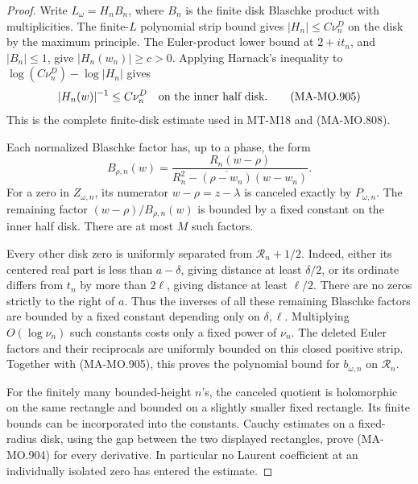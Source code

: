\begin{proof}
Write \(L_\omega=H_nB_n\), where \(B_n\) is the
finite disk Blaschke product with multiplicities.
The finite-\(L\) polynomial strip bound gives
\(|H_n|\le C\nu_n^D\) on the disk by the maximum
principle. The Euler-product lower bound at
\(2+it_n\), and \(|B_n|\le1\), give
\(|H_n(w_n)|\ge c>0\). Applying Harnack's
inequality to
\(\log(C\nu_n^D)-\log|H_n|\) gives
\[
                        |H_n(w)|^{-1}\le C\nu_n^D
             \quad\hbox{on the inner half disk}.
 \tag{MA-MO.905}
\]
This is the complete finite-disk estimate used
in MT-M18 and (MA-MO.808).

Each normalized Blaschke factor has, up to a phase,
the form
\[
       B_{\rho,n}(w)=
       \frac{R_n(w-\rho)}
        {R_n^2-\overline{(\rho-w_n)}(w-w_n)} .
 \tag{MA-MO.906}
\]
For a zero in \(Z_{\omega,n}\), its numerator
\(w-\rho=z-\lambda\) is canceled exactly by
\(P_{\omega,n}\). The remaining factor
\((w-\rho)/B_{\rho,n}(w)\) is bounded by a
fixed constant on the inner half disk.
There are at most \(M\) such factors.

Every other disk zero is uniformly separated
from \(\mathcal R_n+1/2\). Indeed, either its
centered real part is less than \(a-\delta\),
giving distance at least \(\delta/2\), or
its ordinate differs from \(t_n\) by more
than \(2\ell\), giving distance at least
\(\ell/2\). There are no zeros strictly
to the right of \(a\). Thus the inverses
of all these remaining Blaschke factors
are bounded by a fixed constant depending
only on \(\delta,\ell\). Multiplying
\(O(\log\nu_n)\) such constants costs
only a fixed power of \(\nu_n\).
The deleted Euler factors and their
reciprocals are uniformly bounded on
this closed positive strip. Together
with (MA-MO.905), this proves the
polynomial bound for \(b_{\omega,n}\)
on \(\mathcal R_n\).

For the finitely many bounded-height \(n\)'s,
the canceled quotient is holomorphic on the
same rectangle and bounded on a slightly
smaller fixed rectangle. Its finite bounds
can be incorporated into the constants.
Cauchy estimates on a fixed-radius disk,
using the gap between the two displayed
rectangles, prove (MA-MO.904) for every
derivative. In particular no Laurent
coefficient at an individually isolated
zero has entered the estimate.


\end{proof}
